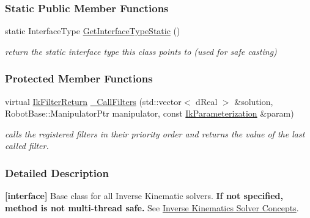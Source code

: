 \subsubsection*{Static Public Member Functions}
\begin{DoxyCompactItemize}
\item 
\hypertarget{classOpenRAVE_1_1IkSolverBase_affeafe65e7c4094f282d273dedbf069b}{
static InterfaceType \hyperlink{classOpenRAVE_1_1IkSolverBase_affeafe65e7c4094f282d273dedbf069b}{GetInterfaceTypeStatic} ()}
\label{classOpenRAVE_1_1IkSolverBase_affeafe65e7c4094f282d273dedbf069b}

\begin{DoxyCompactList}\small\item\em return the static interface type this class points to (used for safe casting) \item\end{DoxyCompactList}\end{DoxyCompactItemize}
\subsubsection*{Protected Member Functions}
\begin{DoxyCompactItemize}
\item 
\hypertarget{classOpenRAVE_1_1IkSolverBase_a5da49b954a8094d7d1a7525ff293496c}{
virtual \hyperlink{namespaceOpenRAVE_a7a8cf38163621e225d83b4b3a8ff62e9}{IkFilterReturn} \hyperlink{classOpenRAVE_1_1IkSolverBase_a5da49b954a8094d7d1a7525ff293496c}{\_\-CallFilters} (std::vector$<$ dReal $>$ \&solution, RobotBase::ManipulatorPtr manipulator, const \hyperlink{classOpenRAVE_1_1IkParameterization}{IkParameterization} \&param)}
\label{classOpenRAVE_1_1IkSolverBase_a5da49b954a8094d7d1a7525ff293496c}

\begin{DoxyCompactList}\small\item\em calls the registered filters in their priority order and returns the value of the last called filter. \item\end{DoxyCompactList}\end{DoxyCompactItemize}


\subsubsection{Detailed Description}
{\bfseries \mbox{[}interface\mbox{]}} Base class for all Inverse Kinematic solvers. {\bfseries If not specified, method is not multi-\/thread safe.} See \hyperlink{arch__iksolver}{Inverse Kinematics Solver Concepts}. 

